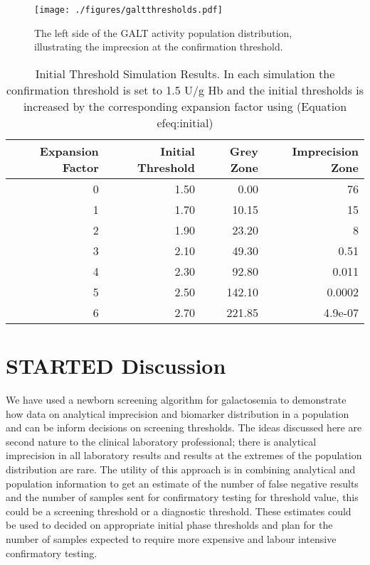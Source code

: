 \documentclass[review]{elsarticle}
\begin{document}
\begin{figure}[htbp]
\centering
\texttt{[image: ./figures/galtthresholds.pdf]}
\caption{\label{fig:orgb9fc8fd}The left side of the GALT activity population distribution, illustrating the imprecsion at the confirmation threshold.}
\end{figure}


\begin{table}[ht]
\centering
\begin{tabular}{rrrr}
  \hline
Expansion Factor & Initial Threshold & Grey Zone & Imprecision Zone \\ 
  \hline
  0 & 1.50 & 0.00 &  76 \\ 
    1 & 1.70 & 10.15 &  15 \\ 
    2 & 1.90 & 23.20 &   8 \\ 
    3 & 2.10 & 49.30 & 0.51 \\ 
    4 & 2.30 & 92.80 & 0.011 \\ 
    5 & 2.50 & 142.10 & 0.0002 \\ 
    6 & 2.70 & 221.85 & 4.9e-07 \\ 
   \hline
\end{tabular}
\caption{Initial Threshold Simulation Results. In each simulation the confirmation threshold is set to 1.5 U/g Hb and the initial thresholds is increased by the corresponding expansion factor using (Equation 
ef{eq:initial})} 
\label{tab:imprecision}
\end{table}

\clearpage

\section*{{\bfseries\sffamily STARTED} Discussion}
\label{sec:orge62acb5}

We have used a newborn screening algorithm for galactosemia to
demonstrate how data on analytical imprecision and biomarker
distribution in a population and can be inform decisions on screening
thresholds. The ideas discussed here are second nature to the clinical
laboratory professional; there is analytical imprecision in all
laboratory results and results at the extremes of the population
distribution are rare. The utility of this approach is in combining
analytical and population information to get an estimate of the number
of false negative results and the number of samples sent for
confirmatory testing for threshold value, this could be a screening
threshold or a diagnostic threshold. These estimates could be used to
decided on appropriate initial phase thresholds and plan for the
number of samples expected to require more expensive and labour
intensive confirmatory testing.
\end{document}
